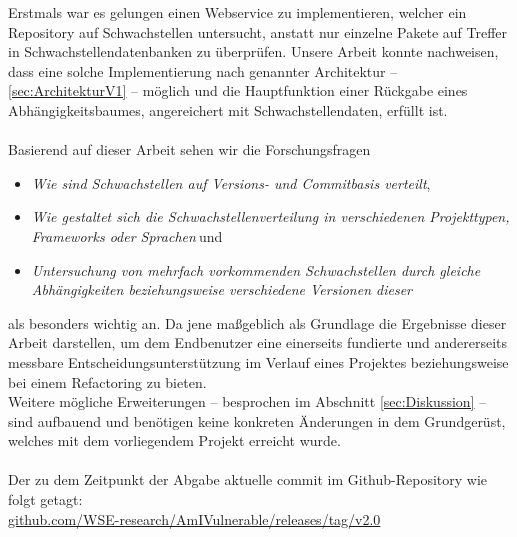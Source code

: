    Erstmals war es gelungen einen Webservice zu implementieren, welcher ein Repository auf Schwachstellen untersucht, anstatt nur einzelne Pakete auf Treffer in Schwachstellendatenbanken zu über\-prüfen.
    Unsere Arbeit konnte nachweisen, dass eine solche Implementierung nach genannter \linebreak[4] Architektur -- \ref{sec:ArchitekturV1} -- möglich und die Hauptfunktion einer Rückgabe eines Abhängigkeitsbaumes, angereichert mit Schwachstellendaten, erfüllt ist.
    \\ \\
    Basierend auf dieser Arbeit sehen wir die Forschungsfragen
    \begin{itemize}
        \item \glqq \textit{Wie sind Schwachstellen auf Versions- und Commitbasis verteilt}\grqq,
        \item \glqq \textit{Wie gestaltet sich die Schwachstellenverteilung in verschiedenen Projekttypen, Frameworks oder Sprachen}\grqq$~$und
        \item \glqq \textit{Untersuchung von mehrfach vorkommenden Schwachstellen durch gleiche Abhängigkeiten beziehungsweise verschiedene Versionen dieser}\grqq
    \end{itemize}
    als besonders wichtig an.
    Da jene maßgeblich als Grundlage die Ergebnisse dieser Arbeit darstellen, um dem Endbenutzer eine einerseits fundierte und andererseits messbare Entscheidungsunterstützung im Verlauf eines Projektes beziehungsweise bei einem Refactoring zu bieten.
    \\
    Weitere mögliche Erweiterungen -- besprochen im Abschnitt \ref{sec:Diskussion}  -- sind aufbauend und benötigen keine konkreten Änderungen in dem Grundgerüst, welches mit dem vorliegendem Projekt erreicht wurde.
    \\ \\
    Der zu dem Zeitpunkt der Abgabe aktuelle commit im Github-Repository wie folgt getagt: \\
    \href{https://github.com/WSE-research/AmIVulnerable/releases/tag/v2.0}{github.com/WSE-research/AmIVulnerable/releases/tag/v2.0}
